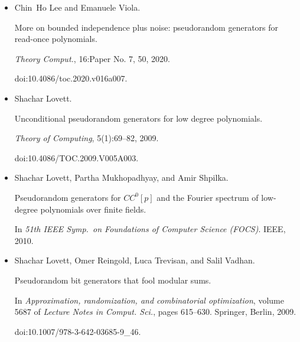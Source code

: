 \documentclass[10pt,a4paper]{article}
\begin{document}
\begin{itemize}
More on bounded independence plus noise: Pseudorandom generators for
read-once polynomials.


\emph{Theory of Computing}, 16:1–50, 2020.


Available at
https://www.ccs.neu.edu/home/viola/papers/LV-rop.pdf.


doi:10.4086/TOC.2020.V016A007.





\item[] 
[31]

Chin Ho Lee and Emanuele Viola.


More on bounded independence plus noise: pseudorandom generators for
read-once polynomials.


\emph{Theory Comput.}, 16:Paper No. 7, 50, 2020.


doi:10.4086/toc.2020.v016a007.





\item[] 
[32]

Shachar Lovett.


Unconditional pseudorandom generators for low degree polynomials.


\emph{Theory of Computing}, 5(1):69–82, 2009.


doi:10.4086/TOC.2009.V005A003.





\item[] 
[33]

Shachar Lovett, Partha Mukhopadhyay, and Amir Shpilka.


Pseudorandom generators for $CC^{0}[p]$ and the Fourier spectrum of
low-degree polynomials over finite fields.


In \emph{51th IEEE Symp. on Foundations of Computer Science (FOCS)}.
IEEE, 2010.





\item[] 
[34]

Shachar Lovett, Omer Reingold, Luca Trevisan, and Salil Vadhan.


Pseudorandom bit generators that fool modular sums.


In \emph{Approximation, randomization, and combinatorial
optimization}, volume 5687 of \emph{Lecture Notes in Comput. Sci.}, pages
615–630. Springer, Berlin, 2009.


doi:10.1007/978-3-642-03685-9\_46.






\end{itemize}
\end{document}
